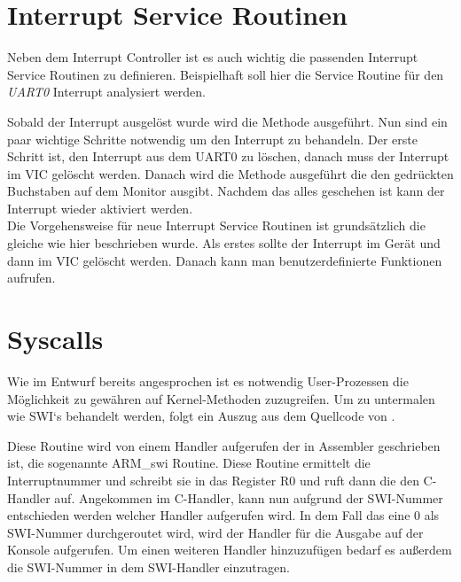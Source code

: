 \section{Interrupt Service Routinen}
Neben dem Interrupt Controller ist es auch wichtig die passenden Interrupt Service Routinen zu definieren. Beispielhaft soll hier die Service Routine f\"ur den \textit{UART0} Interrupt analysiert werden. 

Sobald der Interrupt ausgel\"ost wurde wird die Methode ausgef\"uhrt. Nun sind ein paar wichtige Schritte notwendig um den Interrupt zu behandeln. Der erste Schritt ist, den Interrupt aus dem UART0 zu l\"oschen, danach muss der Interrupt im VIC gel\"oscht werden. Danach wird die Methode ausgef\"uhrt die den gedr\"uckten Buchstaben auf dem Monitor ausgibt.
Nachdem das alles geschehen ist kann der Interrupt wieder aktiviert werden.\\
Die Vorgehensweise f\"ur neue Interrupt Service Routinen ist grunds\"atzlich die gleiche wie hier beschrieben wurde. Als erstes sollte der Interrupt im Ger\"at und dann im VIC gel\"oscht werden. Danach kann man benutzerdefinierte Funktionen aufrufen.
\section{Syscalls}
Wie im Entwurf bereits angesprochen ist es notwendig User-Prozessen die M\"oglichkeit zu gew\"ahren auf Kernel-Methoden zuzugreifen. Um zu untermalen wie SWI`s behandelt werden, folgt ein Auszug aus dem Quellcode von \mops.

Diese Routine wird von einem Handler aufgerufen der in Assembler geschrieben ist, die sogenannte ARM\_swi Routine. Diese Routine ermittelt die Interruptnummer und schreibt sie in das Register R0 und ruft dann die den C-Handler auf. Angekommen im C-Handler, kann nun aufgrund der SWI-Nummer entschieden werden welcher Handler aufgerufen wird. In dem Fall das eine 0 als SWI-Nummer durchgeroutet wird, wird der Handler f\"ur die Ausgabe auf der Konsole aufgerufen. Um einen weiteren Handler hinzuzuf\"ugen bedarf es au\ss erdem die SWI-Nummer in dem SWI-Handler einzutragen.

